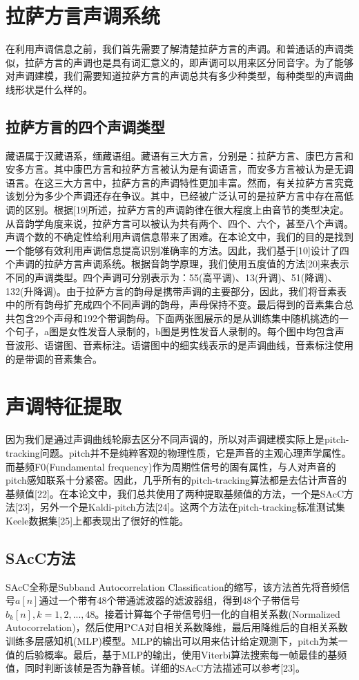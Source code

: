 \section{拉萨方言声调系统}
在利用声调信息之前，我们首先需要了解清楚拉萨方言的声调。和普通话的声调类似，拉萨方言的声调也是具有词汇意义的，即声调可以用来区分同音字。为了能够对声调建模，我们需要知道拉萨方言的声调总共有多少种类型，每种类型的声调曲线形状是什么样的。
\subsection{拉萨方言的四个声调类型}
藏语属于汉藏语系，缅藏语组。藏语有三大方言，分别是：拉萨方言、康巴方言和安多方言。其中康巴方言和拉萨方言被认为是有调语言，而安多方言被认为是无调语言。在这三大方言中，拉萨方言的声调特性更加丰富。然而，有关拉萨方言究竟该划分为多少个声调还存在争议。其中，已经被广泛认可的是拉萨方言中存在高低调的区别。根据[19]所述，拉萨方言的声调韵律在很大程度上由音节的类型决定。从音韵学角度来说，拉萨方言可以被认为共有两个、四个、六个，甚至八个声调。声调个数的不确定性给利用声调信息带来了困难。在本论文中，我们的目的是找到一个能够有效利用声调信息提高识别准确率的方法。因此，我们基于[10]设计了四个声调的拉萨方言声调系统。根据音韵学原理，我们使用五度值的方法[20]来表示不同的声调类型。四个声调可分别表示为：55(高平调)、13(升调)、51(降调)、132(升降调)。由于拉萨方言的韵母是携带声调的主要部分，因此，我们将音素表中的所有韵母扩充成四个不同声调的韵母，声母保持不变。最后得到的音素集合总共包含29个声母和192个带调韵母。下面两张图展示的是从训练集中随机挑选的一个句子，a图是女性发音人录制的，b图是男性发音人录制的。每个图中均包含声音波形、语谱图、音素标注。语谱图中的细实线表示的是声调曲线，音素标注使用的是带调的音素集合。{\color{red}{补充期刊论文图5}}
\section{声调特征提取}
因为我们是通过声调曲线轮廓去区分不同声调的，所以对声调建模实际上是pitch-tracking问题。pitch并不是纯粹客观的物理性质，它是声音的主观心理声学属性。而基频F0(Fundamental frequency)作为周期性信号的固有属性，与人对声音的pitch感知联系十分紧密。因此，几乎所有的pitch-tracking算法都是去估计声音的基频值[22]。在本论文中，我们总共使用了两种提取基频值的方法，一个是SAcC方法[23]，另外一个是Kaldi-pitch方法[24]。这两个方法在pitch-tracking标准测试集Keele数据集[25]上都表现出了很好的性能。
\subsection{SAcC方法}
SAcC全称是Subband Autocorrelation Classification的缩写，该方法首先将音频信号$a[n]$通过一个带有48个带通滤波器的滤波器组，得到48个子带信号$b_k[n],k=1,2,...,48$。接着计算每个子带信号归一化的自相关系数(Normalized Autocorrelation)，然后使用PCA对自相关系数降维，最后用降维后的自相关系数训练多层感知机(MLP)模型。MLP的输出可以用来估计给定观测下，pitch为某一值的后验概率。最后，基于MLP的输出，使用Viterbi算法搜索每一帧最佳的基频值，同时判断该帧是否为静音帧。详细的SAcC方法描述可以参考[23]。
